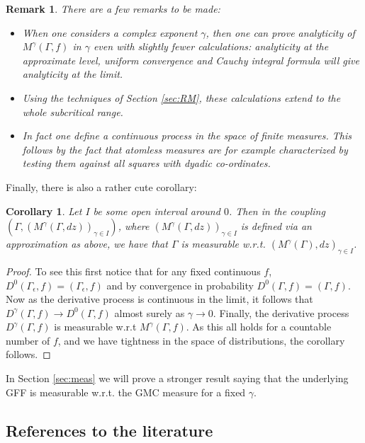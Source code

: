 \documentclass[11pt]{amsart}
\newtheorem{rem}[thm]{Remark}
\newtheorem{cor}[thm]{Corollary}
\renewcommand{\1}{\mathbf 1}
\newcommand{\eps}{\epsilon}
\begin{document}
\begin{rem} There are a few remarks to be made:
\begin{itemize} 
\item When one considers a complex exponent $\gamma$, then one can prove analyticity of $M^\gamma(\Gamma,f)$ in $\gamma$ even with slightly fewer calculations: analyticity at the approximate level, uniform convergence and Cauchy integral formula will give analyticity at the limit.
\item Using the techniques of Section \ref{sec:RM}, these calculations extend to the whole subcritical range. 
\item In fact one define a continuous process in the space of finite measures. This follows by the fact that atomless measures are for example characterized by testing them against all squares with dyadic co-ordinates.
\end{itemize}
\end{rem}

Finally, there is also a rather cute corollary:

\begin{cor}
Let $I$ be some open interval around $0$. Then in the coupling $\left(\Gamma,(M^{\gamma}(\Gamma,dz))_{\gamma \in I}\right)$, where $(M^{\gamma}(\Gamma,dz))_{\gamma \in I}$ is defined via an approximation as above, we have that $\Gamma$ is measurable w.r.t. $(M^{\gamma}(\Gamma),dz)_{\gamma \in I}$.
\end{cor}

\begin{proof}
To see this first notice that for any fixed continuous $f$, $D^0(\Gamma_\eps,f) = (\Gamma_\eps,f)$ and by convergence in probability $D^0(\Gamma,f) = (\Gamma,f)$. Now as the derivative process is continuous in the limit, it follows that $D^{\gamma}(\Gamma,f) \to D^0(\Gamma,f)$ almost surely as $\gamma \to 0$. Finally, the derivative process $D^{\gamma}(\Gamma,f)$ is measurable w.r.t $M^\gamma(\Gamma,f)$. As this all holds for a countable number of $f$, and we have tightness in the space of distributions, the corollary follows.
\end{proof}


In Section \ref{sec:meas} we will prove a stronger result saying that the underlying GFF is measurable w.r.t. the GMC measure for a fixed $\gamma$.

\subsection*{References to the literature}
\end{document}
